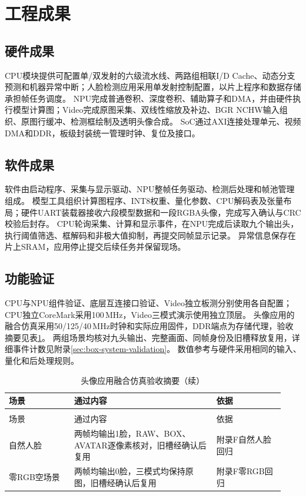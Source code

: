 \section{工程成果}

\subsection{硬件成果}

CPU模块提供可配置单/双发射的六级流水线、两路组相联I/D Cache、动态分支预测和机器异常中断；人脸检测应用采用单发射控制配置，以片上程序和数据存储承担帧任务调度。
NPU完成普通卷积、深度卷积、辅助算子和DMA，并由硬件执行模型计算图；Video完成原图采集、双线性缩放及补边、BGR NCHW输入组织、原图行缓冲、检测框绘制及透明头像合成。
SoC通过AXI连接处理单元、视频DMA和DDR，板级封装统一管理时钟、复位及接口。


\subsection{软件成果}

软件由启动程序、采集与显示驱动、NPU整帧任务驱动、检测后处理和帧池管理组成。
模型工具组织计算图程序、INT8权重、量化参数、CPU解码表及张量布局；硬件UART装载器接收六段模型数据和一段RGBA头像，完成写入确认与CRC校验后封存。
CPU轮询采集、计算和显示事件，在NPU完成后读取九个输出头，执行阈值筛选、框解码和非极大值抑制，再提交同帧显示记录。
异常信息保存在片上SRAM，应用停止提交后续任务并保留现场。


\subsection{功能验证}

CPU与NPU组件验证、底层互连接口验证、Video独立板测分别使用各自配置；CPU独立CoreMark采用100\,MHz，Video三模式演示使用独立顶层。
头像应用的融合仿真采用50/125/40\,MHz时钟和实际应用固件，DDR端点为存储代理，验收摘要见表\ref{tbl:box-system-summary}。
两组场景均核对九头输出、完整画面、同帧身份及旧槽释放复用，详细事件计数见附录\ref{sec:box-system-validation}。
数值参考与硬件采用相同的输入、量化和后处理规则。

\begin{reporttable}
\begin{longtable}{@{}p{0.22\linewidth}p{0.48\linewidth}p{0.23\linewidth}@{}}
\caption{头像应用融合仿真验收摘要}\label{tbl:box-system-summary}\\
\toprule
场景 & 通过内容 & 依据 \\
\midrule
\endfirsthead
\caption[]{头像应用融合仿真验收摘要（续）}\\
\toprule
场景 & 通过内容 & 依据 \\
\midrule
\endhead
\bottomrule
\endfoot
自然人脸 & 两帧均输出1脸，RAW、BOX、AVATAR逐像素核对，旧槽经确认后复用 & 附录F自然人脸回归 \\
零RGB空场景 & 两帧均输出0脸，三模式均保持原图，旧槽经确认后复用 & 附录F零RGB回归 \\
\end{longtable}
\end{reporttable}


